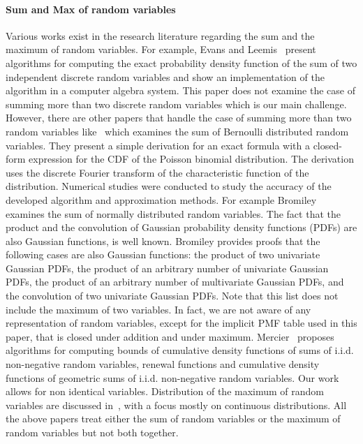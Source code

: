 \documentclass[review]{elsarticle}
\begin{document}
\paragraph{Sum and Max of random variables} Various works exist in the research literature regarding the sum and the maximum of random variables. For example, Evans and Leemis~\cite{evans2004algorithms} present algorithms for computing the exact probability density function of the sum of two independent discrete random variables and show an implementation of the algorithm in a computer algebra system. This paper does not examine the case of summing more than two discrete random variables which is our main challenge.  However, there are other papers that handle the case of summing more than two random variables like~\cite{hong2013computing} which examines the sum of Bernoulli distributed random variables. They present a simple derivation for an exact formula with a closed-form expression for the CDF of the Poisson binomial distribution. The derivation uses the discrete Fourier transform of the characteristic function of the distribution. Numerical studies were conducted to study the accuracy of the developed algorithm and approximation methods.
For example Bromiley~\cite{bromiley2013products} examines the sum of normally distributed random variables. The fact that the product and the convolution of Gaussian probability density functions (PDFs) are also Gaussian functions, is well known. Bromiley provides proofs that the following cases are also Gaussian functions: the product of two univariate Gaussian PDFs, the product of an arbitrary number of univariate Gaussian PDFs, the product of an arbitrary number of multivariate Gaussian PDFs, and the convolution of two univariate Gaussian PDFs. Note that this list does not include the maximum of two variables. In fact, we are not aware of any representation of random variables, except for the implicit PMF table used in this paper, that is closed under addition and under maximum. Mercier~\cite{mercier2007discrete} proposes algorithms for computing bounds of cumulative density functions of sums of i.i.d. non-negative random variables, renewal functions and cumulative density functions of geometric sums of i.i.d. non-negative random variables. Our work allows for non identical variables. Distribution of the maximum of random variables are discussed in~\cite{devroye1980generating}, with a focus mostly on continuous distributions. All the above papers treat either the sum of random variables or the maximum of random variables but not both together. 
\end{document}
